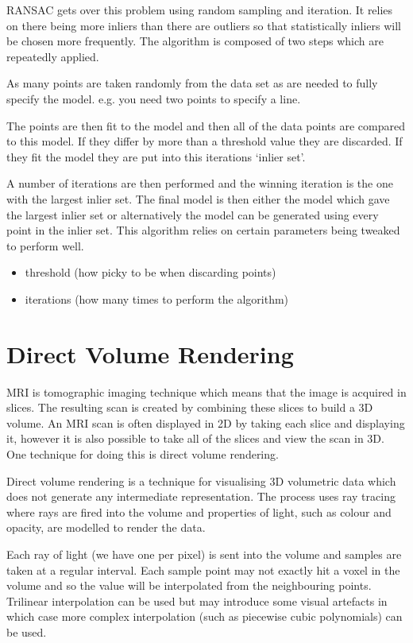 RANSAC gets over this problem using random sampling and iteration. It relies on there being more inliers than there are outliers so that statistically inliers will be chosen more frequently. The algorithm is composed of two steps which are repeatedly applied.

As many points are taken randomly from the data set as are needed to fully specify the model. e.g. you need two points to specify a line.

The points are then fit to the model and then all of the data points are compared to this model. If they differ by more than a threshold value they are discarded. If they fit the model they are put into this iterations ‘inlier set’.

A number of iterations are then performed and the winning iteration is the one with the largest inlier set. The final model is then either the model which gave the largest inlier set or alternatively the model can be generated using every point in the inlier set. This algorithm relies on certain parameters being tweaked to perform well.

\begin{itemize}
	\item threshold (how picky to be when discarding points)
	\item iterations (how many times to perform the algorithm)
\end{itemize}

\newpage
\section{Direct Volume Rendering}
\cite{nvidia:volumerendering}
MRI is tomographic imaging technique which means that the image is acquired in slices. The resulting scan is created by combining these slices to build a 3D volume. An MRI scan is often displayed in 2D by taking each slice and displaying it, however it is also possible to take all of the slices and view the scan in 3D. One technique for doing this is direct volume rendering.

Direct volume rendering is a technique for visualising 3D volumetric data which does not generate any intermediate representation. The process uses ray tracing where rays are fired into the volume and properties of light, such as colour and opacity, are modelled to render the data.

Each ray of light (we have one per pixel) is sent into the volume and samples are taken at a regular interval. Each sample point may not exactly hit a voxel in the volume and so the value will be interpolated from the neighbouring points. Trilinear interpolation can be used but may introduce some visual artefacts in which case more complex interpolation (such as piecewise cubic polynomials) can be used.

